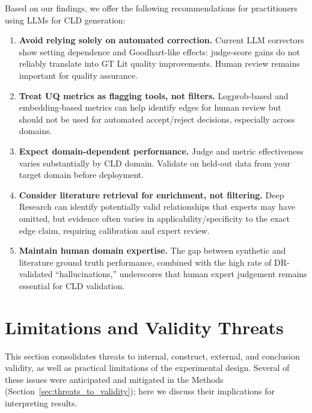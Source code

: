 Based on our findings, we offer the following recommendations for practitioners using LLMs for CLD generation:

\begin{enumerate}
    \item \textbf{Avoid relying solely on automated correction.} Current LLM correctors show setting dependence and Goodhart-like effects: judge-score gains do not reliably translate into GT Lit quality improvements. Human review remains important for quality assurance.
    
    \item \textbf{Treat UQ metrics as flagging tools, not filters.} Logprob-based and embedding-based metrics can help identify edges for human review but should not be used for automated accept/reject decisions, especially across domains.
    
    \item \textbf{Expect domain-dependent performance.} Judge and metric effectiveness varies substantially by CLD domain. Validate on held-out data from your target domain before deployment.
    
    \item \textbf{Consider literature retrieval for enrichment, not filtering.} Deep Research can identify potentially valid relationships that experts may have omitted, but evidence often varies in applicability/specificity to the exact edge claim, requiring calibration and expert review.
    
    \item \textbf{Maintain human domain expertise.} The gap between synthetic and literature ground truth performance, combined with the high rate of DR-validated ``hallucinations,'' underscores that human expert judgement remains essential for CLD validation.
\end{enumerate}

\section{Limitations and Validity Threats}
\label{sec:discussion_limitations}

This section consolidates threats to internal, construct, external, and conclusion validity, as well as practical limitations of the experimental design. Several of these issues were anticipated and mitigated in the Methods (Section~\ref{sec:threats_to_validity}); here we discuss their implications for interpreting results.

